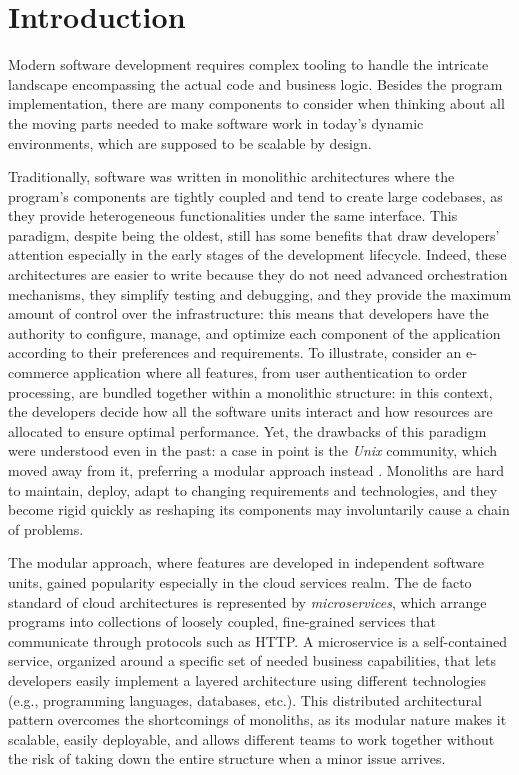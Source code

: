 \chapter{Introduction}
\label{chap:introduction}
Modern software development requires complex tooling to handle
the intricate landscape encompassing the actual code and business logic.
Besides the program implementation, there are many components to consider
when thinking about all the moving parts needed to make software work
in today's dynamic environments, which are supposed to be scalable by design.

Traditionally, software was written in monolithic architectures where
the program's components are tightly coupled and tend to create
large codebases, as they provide heterogeneous functionalities under the same interface.
This paradigm, despite being the oldest, still has some benefits that
draw developers' attention especially in the early stages of the development lifecycle.
Indeed, these architectures are easier to write because they do not need advanced orchestration mechanisms,
they simplify testing and debugging, and they provide the maximum amount of control over the infrastructure:
this means that developers have the authority to configure, manage,
and optimize each component of the application according to their preferences and requirements.
To illustrate, consider an e-commerce application where all features,
from user authentication to order processing, are bundled together within a monolithic structure:
in this context, the developers decide how all the software units interact
and how resources are allocated to ensure optimal performance.
Yet, the drawbacks of this paradigm were understood even in the past:
a case in point is the \textit{Unix} community, which moved away from it,
preferring a modular approach instead \cite{unix}. Monoliths are hard to maintain, deploy,
adapt to changing requirements and technologies, and they
become rigid quickly as reshaping its components may involuntarily cause a chain of problems.

The modular approach, where features are developed in
independent software units, gained popularity especially in the cloud services realm.
The de facto standard of cloud architectures is represented by \textit{microservices},
which arrange programs into collections of loosely coupled, fine-grained services
that communicate through protocols such as HTTP.
A microservice is a self-contained service, organized around a specific set
of needed business capabilities, that lets developers easily implement a layered architecture
using different technologies (e.g., programming languages, databases, etc.).
This distributed architectural pattern overcomes the shortcomings of monoliths,
as its modular nature makes it scalable, easily deployable, and allows different teams
to work together without the risk of taking down the entire structure when a minor issue arrives.

